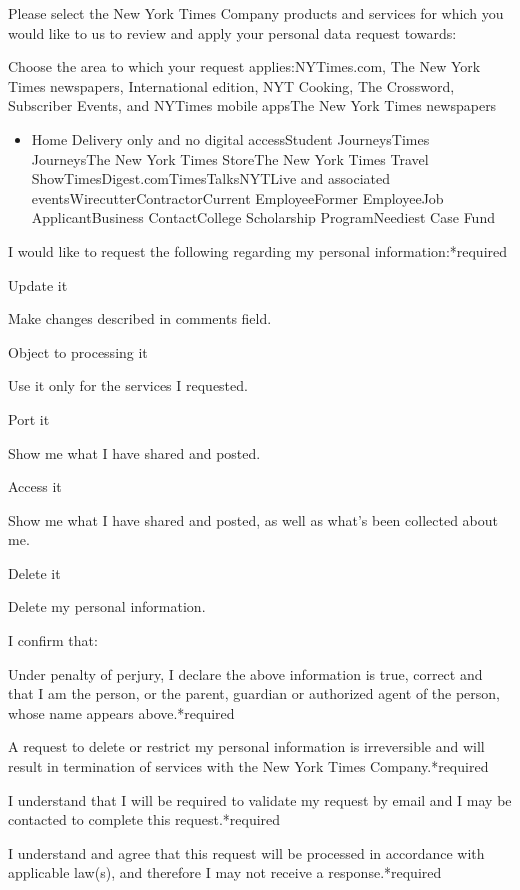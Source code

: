 Please select the New York Times Company products and services for which
you would like to us to review and apply your personal data request
towards:

Choose the area to which your request applies:NYTimes.com, The New York
Times newspapers, International edition, NYT Cooking, The Crossword,
Subscriber Events, and NYTimes mobile appsThe New York Times newspapers

\begin{itemize}
\tightlist
\item
  Home Delivery only and no digital accessStudent JourneysTimes
  JourneysThe New York Times StoreThe New York Times Travel
  ShowTimesDigest.comTimesTalksNYTLive and associated
  eventsWirecutterContractorCurrent EmployeeFormer EmployeeJob
  ApplicantBusiness ContactCollege Scholarship ProgramNeediest Case Fund
\end{itemize}

I would like to request the following regarding my personal
information:*required

Update it

Make changes described in comments field.

Object to processing it

Use it only for the services I requested.

Port it

Show me what I have shared and posted.

Access it

Show me what I have shared and posted, as well as what's been collected
about me.

Delete it

Delete my personal information.

I confirm that:

Under penalty of perjury, I declare the above information is true,
correct and that I am the person, or the parent, guardian or authorized
agent of the person, whose name appears above.*required

A request to delete or restrict my personal information is irreversible
and will result in termination of services with the New York Times
Company.*required

I understand that I will be required to validate my request by email and
I may be contacted to complete this request.*required

I understand and agree that this request will be processed in accordance
with applicable law(s), and therefore I may not receive a
response.*required

